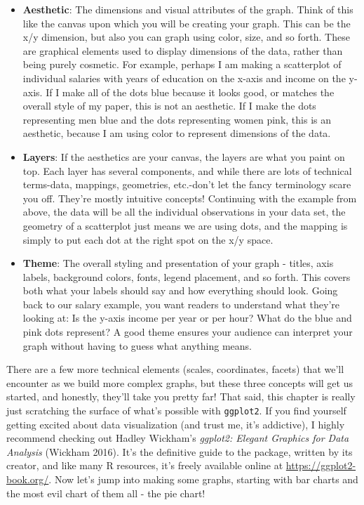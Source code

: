\documentclass[
  letterpaper,
]{book}
\begin{document}
\begin{itemize}
\item
  \textbf{Aesthetic}: The dimensions and visual attributes of the graph.
  Think of this like the canvas upon which you will be creating your
  graph. This can be the x/y dimension, but also you can graph using
  color, size, and so forth. These are graphical elements used to
  display dimensions of the data, rather than being purely cosmetic. For
  example, perhaps I am making a scatterplot of individual salaries with
  years of education on the x-axis and income on the y-axis. If I make
  all of the dots blue because it looks good, or matches the overall
  style of my paper, this is not an aesthetic. If I make the dots
  representing men blue and the dots representing women pink, this is an
  aesthetic, because I am using color to represent dimensions of the
  data.
\item
  \textbf{Layers}: If the aesthetics are your canvas, the layers are
  what you paint on top. Each layer has several components, and while
  there are lots of technical terms-data, mappings, geometries,
  etc.-don't let the fancy terminology scare you off. They're mostly
  intuitive concepts! Continuing with the example from above, the data
  will be all the individual observations in your data set, the geometry
  of a scatterplot just means we are using dots, and the mapping is
  simply to put each dot at the right spot on the x/y space.
\item
  \textbf{Theme}: The overall styling and presentation of your graph -
  titles, axis labels, background colors, fonts, legend placement, and
  so forth. This covers both what your labels should say and how
  everything should look. Going back to our salary example, you want
  readers to understand what they're looking at: Is the y-axis income
  per year or per hour? What do the blue and pink dots represent? A good
  theme ensures your audience can interpret your graph without having to
  guess what anything means.
\end{itemize}

There are a few more technical elements (scales, coordinates, facets)
that we'll encounter as we build more complex graphs, but these three
concepts will get us started, and honestly, they'll take you pretty far!
That said, this chapter is really just scratching the surface of what's
possible with \texttt{ggplot2}. If you find yourself getting excited
about data visualization (and trust me, it's addictive), I highly
recommend checking out Hadley Wickham's \emph{ggplot2: Elegant Graphics
for Data Analysis} (Wickham 2016). It's the definitive guide to the
package, written by its creator, and like many R resources, it's freely
available online at \url{https://ggplot2-book.org/}. Now let's jump into
making some graphs, starting with bar charts and the most evil chart of
them all - the pie chart!
\end{document}
